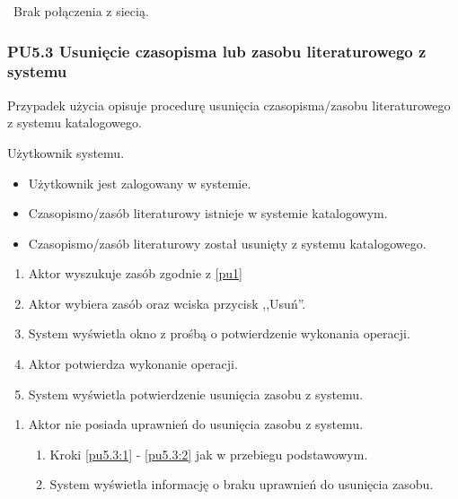 \
Brak połączenia z siecią.

\subsubsection{PU5.3 Usunięcie czasopisma lub zasobu literaturowego z systemu}

Przypadek użycia opisuje procedurę usunięcia czasopisma/zasobu literaturowego z systemu katalogowego.

Użytkownik systemu.

\begin{itemize}
\item Użytkownik jest zalogowany w systemie.
\item Czasopismo/zasób literaturowy istnieje w systemie katalogowym.
\end{itemize}

\begin{itemize}
\item Czasopismo/zasób literaturowy został usunięty z systemu katalogowego.
\end{itemize}

\begin{enumerate}
\item \label{pu5.3:1} Aktor wyszukuje zasób zgodnie z \ref{pu1}
\item \label{pu5.3:2} Aktor wybiera zasób oraz wciska przycisk ,,Usuń''.
\item System wyświetla okno z prośbą o potwierdzenie wykonania operacji.
\item Aktor potwierdza wykonanie operacji.
\item System wyświetla potwierdzenie usunięcia zasobu z systemu.
\end{enumerate}

\begin{enumerate}
\item Aktor nie posiada uprawnień do usunięcia zasobu z systemu.
	\begin{enumerate}[label*=\arabic*.]
		\item Kroki \ref{pu5.3:1} - \ref{pu5.3:2} jak w przebiegu podstawowym.
		\item System wyświetla informację o braku uprawnień do usunięcia zasobu.
	\end{enumerate}
\end{enumerate}

